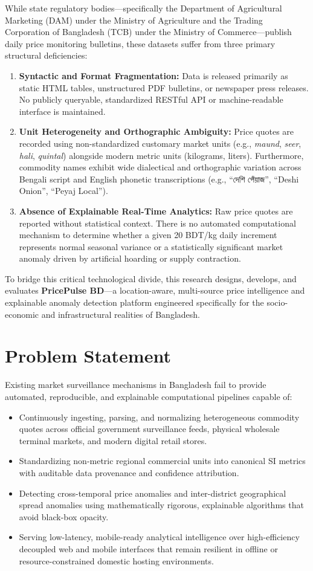 While state regulatory bodies—specifically the Department of Agricultural Marketing (DAM) under the Ministry of Agriculture and the Trading Corporation of Bangladesh (TCB) under the Ministry of Commerce—publish daily price monitoring bulletins, these datasets suffer from three primary structural deficiencies:
\begin{enumerate}
    \item \textbf{Syntactic and Format Fragmentation:} Data is released primarily as static HTML tables, unstructured PDF bulletins, or newspaper press releases. No publicly queryable, standardized RESTful API or machine-readable interface is maintained.
    \item \textbf{Unit Heterogeneity and Orthographic Ambiguity:} Price quotes are recorded using non-standardized customary market units (e.g., \textit{maund}, \textit{seer}, \textit{hali}, \textit{quintal}) alongside modern metric units (kilograms, liters). Furthermore, commodity names exhibit wide dialectical and orthographic variation across Bengali script and English phonetic transcriptions (e.g., ``দেশি পেঁয়াজ'', ``Deshi Onion'', ``Peyaj Local'').
    \item \textbf{Absence of Explainable Real-Time Analytics:} Raw price quotes are reported without statistical context. There is no automated computational mechanism to determine whether a given 20 BDT/kg daily increment represents normal seasonal variance or a statistically significant market anomaly driven by artificial hoarding or supply contraction.
\end{enumerate}

To bridge this critical technological divide, this research designs, develops, and evaluates \textbf{PricePulse BD}—a location-aware, multi-source price intelligence and explainable anomaly detection platform engineered specifically for the socio-economic and infrastructural realities of Bangladesh.

\section{Problem Statement}
Existing market surveillance mechanisms in Bangladesh fail to provide automated, reproducible, and explainable computational pipelines capable of:
\begin{itemize}
    \item Continuously ingesting, parsing, and normalizing heterogeneous commodity quotes across official government surveillance feeds, physical wholesale terminal markets, and modern digital retail stores.
    \item Standardizing non-metric regional commercial units into canonical SI metrics with auditable data provenance and confidence attribution.
    \item Detecting cross-temporal price anomalies and inter-district geographical spread anomalies using mathematically rigorous, explainable algorithms that avoid black-box opacity.
    \item Serving low-latency, mobile-ready analytical intelligence over high-efficiency decoupled web and mobile interfaces that remain resilient in offline or resource-constrained domestic hosting environments.
\end{itemize}

